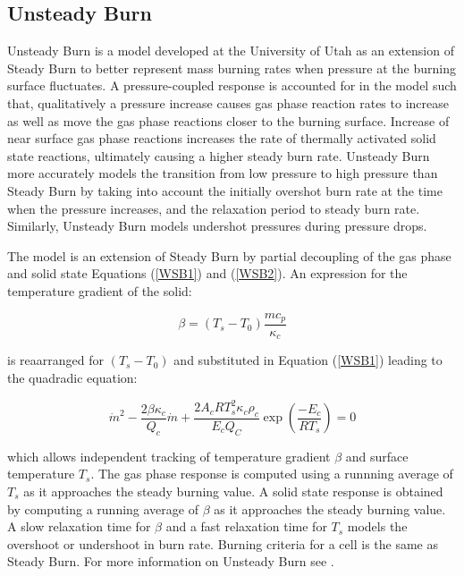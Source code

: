 \newpage
\subsection{Unsteady Burn} \label {Sec:UnsteadyBurn}

Unsteady Burn is a model developed at the University of Utah as an extension of Steady Burn to better represent mass burning rates when pressure at the burning surface fluctuates. A pressure-coupled response is accounted for in the model such that, qualitatively a pressure increase causes gas phase reaction rates to increase as well as move the gas phase reactions closer to the burning surface.  Increase of near surface gas phase reactions increases the rate of thermally activated solid state reactions, ultimately causing a higher steady burn rate.  Unsteady Burn more accurately models the transition from low pressure to high pressure than Steady Burn by taking into account the initially overshot burn rate at the time when the pressure increases, and the relaxation period to steady burn rate.  Similarly, Unsteady Burn models undershot pressures during pressure drops.  

The model is an extension of Steady Burn by partial decoupling of the gas phase and solid state Equations (\ref{WSB1}) and (\ref{WSB2}).  An expression for the temperature gradient of the solid:

\begin{equation}
  \beta = \left(T_s - T_0\right) \frac{m c_p}{\displaystyle\kappa_c}
  \label{WSB7}
\end{equation}

is reaarranged for $(T_s-T_0)$ and substituted in Equation (\ref{WSB1}) leading to the quadradic equation:

\begin{equation}
\dot{m}^2 - \frac{2 \beta \kappa_c}{Q_c} \dot{m} + \frac{2 A_c R T_s^2 \kappa_c \rho_c }{E_c Q_C} \exp\left({\frac{-E_c}{R T_s}}\right)=0
\label{WSB8}
\end{equation}

which allows independent tracking of temperature gradient $\beta$ and surface temperature $T_s$.  The gas phase response is computed using a runnning average of $T_s$ as it approaches the steady burning value.  A solid state response is obtained by computing a running average of $\beta$ as it approaches the steady burning value.  A slow relaxation time for $\beta$ and a fast relaxation time for $T_s$ models the overshoot or undershoot in burn rate.  Burning criteria for a cell is the same as Steady Burn.  For more information on Unsteady Burn see \cite{ref:wighteddings}.

